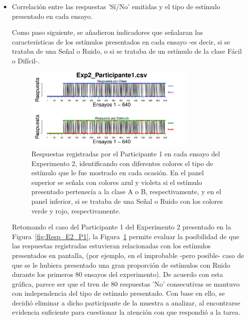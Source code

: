\begin{itemize}
	\item Correlación entre las respuestas 'Sí/No' emitidas y el tipo de estímulo presentado en cada ensayo.

Como paso siguiente, se añadieron indicadores que señalaran las características de los estímulos presentados en cada ensayo -es decir, si se trataba de una Señal o Ruido, o si se trataba de un estímulo de la clase Fácil o Difícil-.\\ 

\begin{figure}[th]
\centering
\includegraphics[width=0.80\textwidth]{Figures/BiasResp_Exp2_P1} 
\decoRule
\caption[Explorando datos individuales (ejemplo): Relación entre la respuesta emitida y el tipo de ensayo]{Respuestas registradas por el Participante 1 en cada ensayo del Experimento 2, identificando con diferentes colores el tipo de estímulo que le fue mostrado en cada ocasión. En el panel superior se señala con colores azul y violeta si el estímulo presentado pertenecía a la clase A o B, respectivamente, y en el panel inferior, si se trataba de una Señal o Ruido con los colores verde y rojo, respectivamente.}
\label{fig:BiasResp_E1_P1}
\end{figure}


Retomando el caso del Participante 1 del Experimento 2 presentado en la Figura~\ref{fig:Resp_E2_P1}, la Figura~\ref{fig:BiasResp_E1_P1} permite evaluar la posibilidad de que las respuestas registradas estuvieran relacionadas con los estímulos presentados en pantalla, (por ejemplo, en el improbable -pero posible- caso de que se le hubiera presentado una gran proporción de estímulos con Ruido durante los primeros 80 ensayos del experimento). De acuerdo con esta gráfica, parece ser que el tren de 80 respuestas 'No' consecutivas se mantuvo con independencia del tipo de estímulo presentado. Con base en ello, se decidió eliminar a dicho participante de la muestra a analizar, al encontrarse evidencia suficiente para cuestionar la atención con que respondió a la tarea.\\


\end{itemize}
